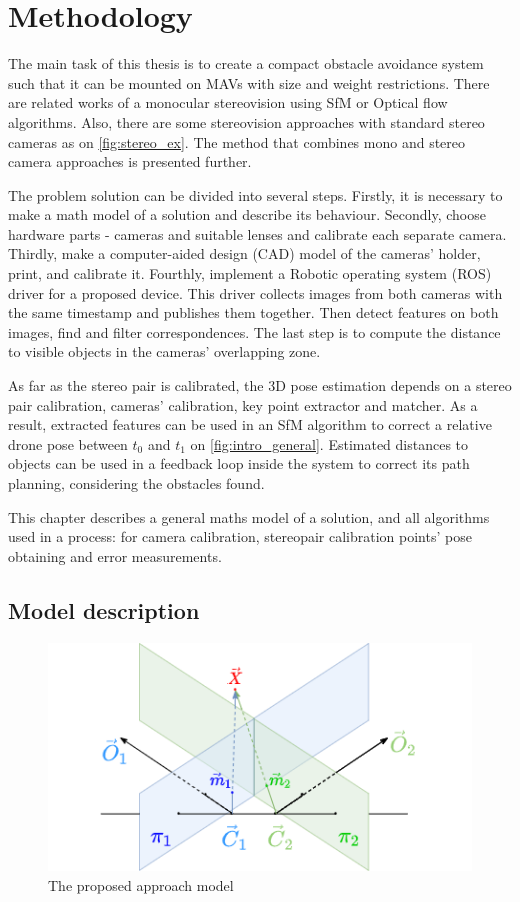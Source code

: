 \chapter{Methodology}

\label{chapter:methodology}

The main task of this thesis is to create a compact obstacle avoidance system such that it can be mounted on MAVs with size and weight restrictions.
There are related works of a monocular stereovision using SfM or Optical flow algorithms. 
Also, there are some stereovision approaches with standard stereo cameras as on \autoref{fig:stereo_ex}.
The method that combines mono and stereo camera approaches is presented further.

The problem solution can be divided into several steps. 
Firstly, it is necessary to make a math model of a solution and describe its behaviour. 
Secondly, choose hardware parts - cameras and suitable lenses and calibrate each separate camera. 
Thirdly, make a computer-aided design (CAD) model of the cameras' holder, print, and calibrate it.
Fourthly, implement a Robotic operating system (ROS) driver for a proposed device. 
This driver collects images from both cameras with the same timestamp and publishes them together.
Then detect features on both images, find and filter correspondences.
The last step is to compute the distance to visible objects in the cameras' overlapping zone.

As far as the stereo pair is calibrated, the 3D pose estimation depends on a stereo pair calibration, cameras' calibration, key point extractor and matcher.
As a result, extracted features can be used in an SfM algorithm to correct a relative drone pose between $t_0$ and $t_1$ on \autoref{fig:intro_general}.
Estimated distances to objects can be used in a feedback loop inside the system to correct its path planning, considering the obstacles found.

This chapter describes a general maths model of a solution, and all algorithms used in a process: for camera calibration, stereopair calibration points' pose obtaining and error measurements.

\section{Model description}

\begin{figure}[h]
    \centering
    \includegraphics[width=.7\textwidth]{graphics/td90deg.png}
    \caption{The proposed approach model}
    \label{fig:td90deg}
\end{figure}

